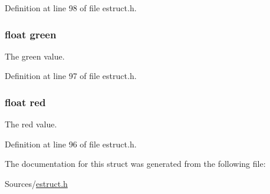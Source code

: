 Definition at line 98 of file estruct.\-h.

\hypertarget{struct__rgba_af8d69af46156237d69b44a880e4f486e}{
\subsubsection[{green}]{\setlength{\rightskip}{0pt plus 5cm}float green}}\label{struct__rgba_af8d69af46156237d69b44a880e4f486e}
The green value. 

Definition at line 97 of file estruct.\-h.

\hypertarget{struct__rgba_acddf4f34ba92c602d4205ba50e98d603}{
\subsubsection[{red}]{\setlength{\rightskip}{0pt plus 5cm}float red}}\label{struct__rgba_acddf4f34ba92c602d4205ba50e98d603}
The red value. 

Definition at line 96 of file estruct.\-h.



The documentation for this struct was generated from the following file\-:\begin{DoxyCompactItemize}
\item 
Sources/\hyperlink{estruct_8h}{estruct.\-h}\end{DoxyCompactItemize}
